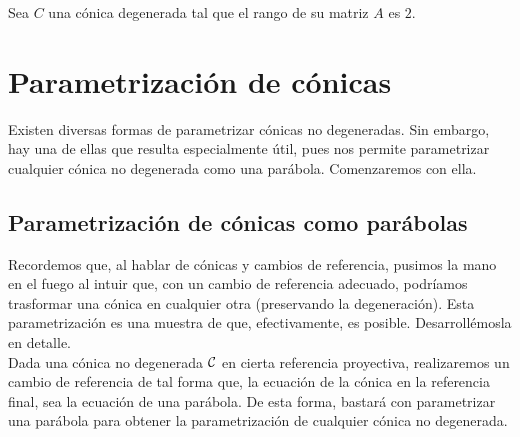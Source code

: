 Sea $C$ una cónica degenerada tal que el rango de su matriz $A$ es $2$.

\section{Parametrización de cónicas}
Existen diversas formas de parametrizar cónicas no degeneradas. Sin embargo, hay una de ellas que resulta especialmente útil, pues nos permite parametrizar cualquier cónica no degenerada como una parábola. Comenzaremos con ella.
\subsection{Parametrización de cónicas como parábolas}
\label{C8_subsec_parametrizacion_como_parabola}
Recordemos que, al hablar de cónicas y cambios de referencia, pusimos la mano en el fuego al intuir que, con un cambio de referencia adecuado, podríamos trasformar una cónica en cualquier otra (preservando la degeneración). Esta parametrización es una muestra de que, efectivamente, es posible. Desarrollémosla en detalle.\\

Dada una cónica no degenerada $\mathcal{C}$ en cierta referencia proyectiva, realizaremos un cambio de referencia de tal forma que, la ecuación de la cónica en la referencia final, sea la ecuación de una parábola. De esta forma, bastará con parametrizar una parábola para obtener la parametrización de cualquier cónica no degenerada.

